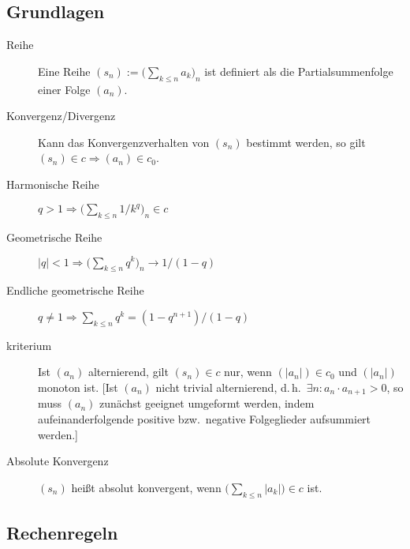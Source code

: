 \subsection{Grundlagen}
\begin{description}
    \item[Reihe] 
        Eine Reihe $(s_n) := \bigl(\sum_{k \leq n} a_k\bigr)_n$ ist definiert als die Partialsummenfolge einer Folge $(a_n)$.
    \item[Konvergenz/Divergenz] 
        Kann das Konvergenzverhalten von $(s_n)$ bestimmt werden, so gilt $(s_n) \in c \Rightarrow (a_n) \in c_0$.
    \item [Harmonische Reihe] 
        $q>1 \Rightarrow \bigl(\sum_{k \leq n} 1/k^q\bigr)_n \in c$
    \item [Geometrische Reihe] 
        $\lvert q \rvert<1 \Rightarrow \bigl(\sum_{k \leq n} q^k\bigr)_n \to 1/(1-q)$
    \item [Endliche geometrische Reihe] 
        $q\neq1 \Rightarrow \sum_{k \leq n} q^k = (1-q^{n+1})/(1-q)$
    \item [kriterium] 
        Ist $(a_n)$ alternierend, gilt $(s_n) \in c$ nur, wenn $(\lvert a_n \rvert) \in c_0$ und $(\lvert a_n \rvert)$ monoton ist.
        [Ist $(a_n)$ nicht trivial alternierend, d.\,h.~$\exists n : a_n \cdot a_{n+1} > 0$, so muss $(a_n)$ zunächst geeignet umgeformt werden, indem aufeinanderfolgende positive bzw.~negative Folgeglieder aufsummiert werden.]
    \item [Absolute Konvergenz] 
        $(s_n)$ heißt absolut konvergent, wenn $\bigl( \sum_{k \leq n} \lvert a_k \rvert \bigr) \in c$ ist.
\end{description}

\subsection{Rechenregeln}

